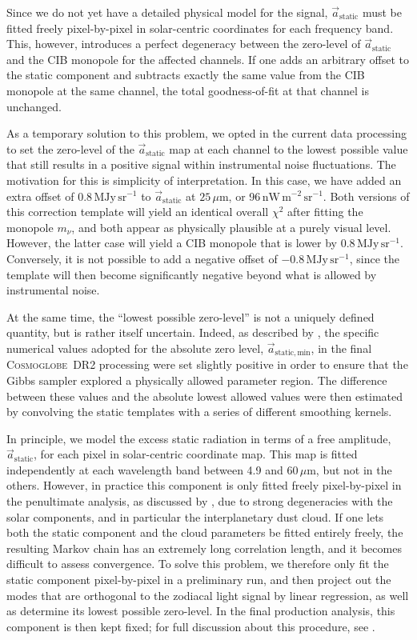 \documentclass{aa}
\renewcommand{\a}[0]{\vec{a}}
\newcommand{\cosmoglobe}{\textsc{Cosmoglobe}}
\begin{document}
Since we do not yet have a detailed physical model for the signal,
$\a_{\mathrm{static}}$ must be fitted freely pixel-by-pixel in
solar-centric coordinates for each frequency band. This, however,
introduces a perfect degeneracy between the zero-level of
$\a_{\mathrm{static}}$ and the CIB monopole for the affected channels.
If one adds an arbitrary offset to the static component and subtracts exactly the same value from the
CIB monopole at the same channel, the total goodness-of-fit at that
channel is unchanged. 

As a temporary solution to this problem, we opted in the current data
processing to set the zero-level of the $\a_{\mathrm{static}}$ map at
each channel to the lowest possible value that still results in a
positive signal within instrumental noise fluctuations. The motivation
for this is simplicity of interpretation. 
In this
case, we have added an extra offset of 0.8\,$\mathrm{MJy\,sr^{-1}}$ to
$\a_{\mathrm{static}}$ at $25\,\mu\mathrm{m}$, or
96$\,\mathrm{nW}\,\mathrm{m}^{-2}\,\mathrm{sr}^{-1}$. Both versions of
this correction template will yield an identical overall $\chi^2$
after fitting the monopole $m_{\nu}$, and both appear as physically
plausible at a purely visual level. However, the latter case will
yield a CIB monopole that is lower by
0.8\,$\mathrm{MJy\,sr^{-1}}$. 
Conversely, it is not possible to add a
negative offset of $-0.8$\,$\mathrm{MJy\,sr^{-1}}$, since the template
will then become significantly negative beyond what is allowed by
instrumental noise.

At the same time, the ``lowest possible zero-level'' is not a uniquely
defined quantity, but is rather itself uncertain. Indeed, as described
by \citet{CG02_01}, the specific numerical values adopted for the
absolute zero level, $\a_{\mathrm{static,min}}$, in the final
\cosmoglobe\ DR2 processing were set slightly positive in order to
ensure that the Gibbs sampler explored a physically allowed parameter
region. The difference between these values and the absolute lowest
allowed values were then estimated by convolving the static templates
with a series of different smoothing kernels. 

In principle, we model the excess static radiation in terms of a free
amplitude, $\a_{\mathrm{static}}$, for each pixel in solar-centric
coordinate map. This map is fitted independently at each wavelength
band between 4.9 and 60$\,\mu\mathrm{m}$, but not in the
others. However, in practice this component is only fitted freely
pixel-by-pixel in the penultimate analysis, as discussed by
\citet{CG02_01}, due to strong degeneracies with the solar components,
and in particular the interplanetary dust cloud. If one lets both the
static component and the cloud parameters be fitted entirely
freely, the resulting Markov chain has an extremely long correlation
length, and it becomes difficult to assess convergence. To solve this
problem, we therefore only fit the static component pixel-by-pixel in
a preliminary run, and then project out the modes that are orthogonal
to the zodiacal light signal by linear regression, as well as
determine its lowest possible zero-level. In the final production analysis, this component is then kept
fixed; for full discussion about this procedure, see \citet{CG02_01}.
\end{document}
